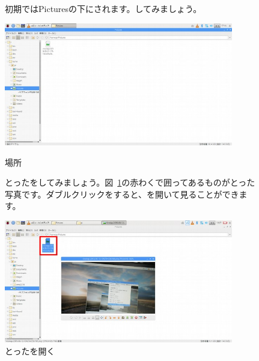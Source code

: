\vspace*{-1.8cm}
\begin{figure}


  \flushleft
  初期ではPicturesの下にされます。してみましょう。

  \centering
  \begin{minipage}{10cm}
    \includegraphics[width=10cm]{text01-img/textbook-img121.jpg}
    \caption{場所}
  \end{minipage}


  \bigskip

  \flushleft
  とったをしてみましょう。図~\ref{fig:33}の赤わくで囲ってあるものがとった写真です。ダブルクリックをすると、を開いて見ることができます。



  \centering
  \begin{minipage}{10cm}
    {\upshape
      \includegraphics[width=10cm]{text01-img/textbook-img122.jpg}
      \caption{とったを開く}\label{fig:33}
    }
  \end{minipage}
\end{figure}

